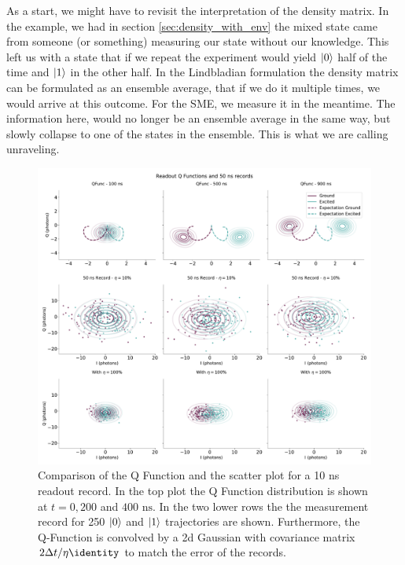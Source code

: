 As a start, we might have to revisit the interpretation of the density matrix. In the example, we had in section \ref{sec:density_with_env} the mixed state came from someone (or something) measuring our state without our knowledge. This left us with a state that if we repeat the experiment would yield $\ket{0}$ half of the time and $\ket{1}$ in the other half. In the Lindbladian formulation the density matrix can be formulated as an ensemble average, that if we do it multiple times, we would arrive at this outcome. For the SME, we measure it in the meantime. The information here, would no longer be an ensemble average in the same way, but slowly collapse to one of the states in the ensemble. This is what we are calling unraveling. 
\begin{figure}[t]
    \centering
    \includegraphics[]{Simulations/readout_simulations/figures/qfunc_trajectories.pdf}
    \caption{Comparison of the Q Function and the scatter plot for a 10 ns readout record. In the top plot the Q Function distribution is shown at $t = 0, 200$ and $400 \text{ ns}$. In the two lower rows the the measurement record for 250 $\ket{0}$ and $\ket{1}$ trajectories are shown. Furthermore, the Q-Function is convolved by a 2d Gaussian with covariance matrix $2 \Delta t / \eta \identity$ to match the error of the records.}
    \label{fig:trajectories_and_qfunc}
\end{figure}

